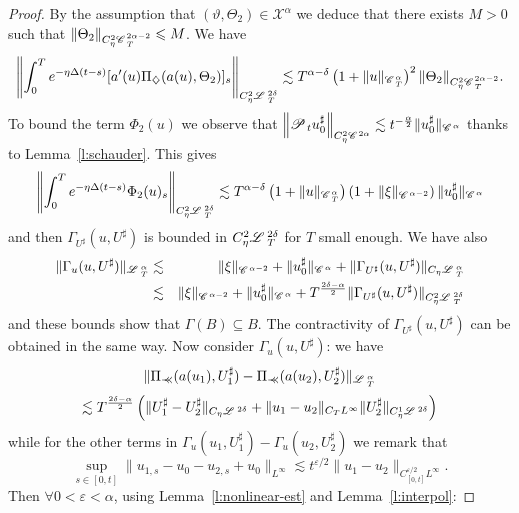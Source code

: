 \documentclass[11pt,reqno]{amsart}
\newcommand{\nocomma}{}
\newcommand{\precprec}{\prec\!\!\!\prec}
\newcommand{\CC}{\mathscr{C} \hspace{.1em}}
\newcommand{\LL}{\mathscr{L} \hspace{.2em}}
\newcommand{\PP}{\mathscr{P} \hspace{.1em}}
\begin{document}
\begin{proof}
  By the assumption that $(\vartheta, \Theta_2) \in \mathcal{X}^{\alpha}$ we
  deduce that there exists $M > 0$ such that $\| \Theta_2 \|_{C_{\eta}^2
  \CC_T^{2 \alpha - 2}} \leqslant M$. We have
  \[ \left\| \int_0^T e^{- \eta \Delta (t - s)} [a' (u) \Pi_{\nocomma
     \diamondsuit} (a (u), \Theta_2)]_s \right\|_{C^2_{\eta} \LL_T^{2 \delta}}
     \lesssim T^{\alpha - \delta} \left( 1 + \| u \|_{\CC^{\alpha}_T}
     \right)^2 \| \Theta_2 \|_{C_{\eta}^2 \CC_T^{2 \alpha - 2}} . \]
  To bound the term $\Phi_2 (u)$ we observe that $\left\| \PP_t u^{\sharp}_0
  \right\|_{C_{\eta}^2 \CC^{2 \alpha}} \lesssim t^{- \frac{\alpha}{2}} \|
  u^{\sharp}_0 \|_{\CC^{\alpha}}$ thanks to Lemma~\ref{l:schauder}. This gives
  \[ \left\| \int_0^T e^{- \eta \Delta (t - s)} \Phi_2 (u)_s
     \right\|_{C^2_{\eta} \LL_T^{2 \delta}} \lesssim T^{\alpha - \delta}
     \left( 1 + \| u \|_{\CC^{\alpha}_T} \right) \left( 1 + \| \xi
     \|_{\CC^{\alpha - 2}} \right) \| u^{\sharp}_0 \|_{\CC^{\alpha}} \]
  and then $\Gamma_{U^{\sharp}} (u, U^{\sharp})$ is bounded in $C^2_{\eta}
  \LL_T^{2 \delta}$ for $T$ small enough. We have also
  \begin{eqnarray*}
    \| \Gamma_u (u, U^{\sharp}) \|_{\LL^{\alpha}_T} & \lesssim & \| \xi
    \|_{\CC^{\alpha - 2}} + \| u^{\sharp}_0 \|_{\CC^{\alpha}} + \|
    \Gamma_{U^{\sharp}} (u, U^{\sharp}) \|_{C_{\eta} \LL_T^{\alpha}}\\
    & \lesssim & \| \xi \|_{\CC^{\alpha - 2}} + \| u^{\sharp}_0
    \|_{\CC^{\alpha}} + T^{\frac{2 \delta - \alpha}{2}} \| \Gamma_{U^{\sharp}}
    (u, U^{\sharp}) \|_{C^2_{\eta} \LL_T^{2 \delta}}
  \end{eqnarray*}
  and these bounds show that $\Gamma (B) \subseteq B$. The contractivity of
  $\Gamma_{U^{\sharp}} (u, U^{\sharp})$ can be obtained in the same way. Now
  consider $\Gamma_u (u, U^{\sharp})$: we have
  \[ \| \Pi_{\precprec} (a (u_1), U_1^{\sharp}) - \Pi_{\precprec} (a (u_2),
     U_2^{\sharp}) \|_{\LL^{\alpha}_T} \]
  \[ \lesssim T^{\frac{2 \delta - \alpha}{2}} \left( \| U^{\sharp}_1 -
     U^{\sharp}_2 \|_{C_{\eta} \LL^{2 \delta}} + \| u_1 - u_2 \|_{C_T
     L^{\infty}} \| U^{\sharp}_2 \|_{C_{\eta}^1 \LL^{2 \delta}} \right) \]
  while for the other terms in $\Gamma_u (u_1, U^{\sharp}_1) - \Gamma_u (u_2,
  U^{\sharp}_2)$ we remark that
  \[ \sup_{s \in [0, t]} \| u_{1, s} - u_0 - u_{2, s} + u_0 \|_{L^{\infty}}
     \lesssim t^{\varepsilon / 2} \| u_1 - u_2 \|_{C_{[0, t]}^{\varepsilon /
     2} L^{\infty}} . \]
  Then $\forall 0 < \varepsilon < \alpha$, using Lemma~\ref{l:nonlinear-est}
  and Lemma~\ref{l:interpol}:

\end{proof}
\end{document}
